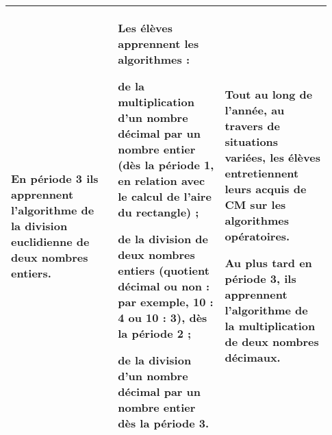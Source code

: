 {\begin{tabular}{|p{0.31\linewidth}|p{0.31\linewidth}|p{0.31\linewidth}|}
En \textbf{période 3} ils apprennent l’algorithme de la
division euclidienne de deux nombres entiers.
&
Les élèves apprennent les algorithmes :
\begin{mylist}
\item de la multiplication d’un nombre décimal par un
nombre entier (dès la \textbf{période 1}, en relation avec
le calcul de l’aire du rectangle) ;
\item de la division de deux nombres entiers (quotient
décimal ou non : par exemple, 10 : 4 ou 10 : 3),
dès la \textbf{période 2} ;
\item de la division d’un nombre décimal par un
nombre entier dès la \textbf{période 3}.
\end{mylist}
&
Tout au long de l’année, au travers de situations
variées, les élèves entretiennent leurs acquis de CM
sur les algorithmes opératoires.\par\vspace{0.25cm}
Au plus tard en \textbf{période 3}, ils apprennent l’algorithme
de la multiplication de deux nombres décimaux.
\\\hline
\end{tabular}
\renewcommand{\arraystretch}{1}
}